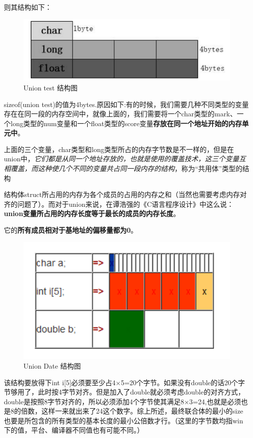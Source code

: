 \documentclass[UTF8,a4paper,12pt]{ctexbook} %
\begin{document}
	        则其结构如下：
	        \begin{figure}[h]
	        	\centering
	        	\includegraphics[width = 12cm]{union.png}
	        	\caption{Union test 结构图}
	        \end{figure} 
	        
	        sizeof(union test)的值为4bytes.原因如下:有的时候，我们需要几种不同类型的变量存在在同一段的内存空间中，就像上面的，我们需要将一个char类型的mark、一个long类型的num变量和一个float类型的score变量\textbf{存放在同一个地址开始的内存单元中}。
	        
	        上面的三个变量，char类型和long类型所占的内存字节数是不一样的，但是在union中，\textit{它们都是从同一个地址存放的，也就是使用的覆盖技术，这三个变量互相覆盖，而这种使几个不同的变量共占同一段内存的结构}，称为“共用体”类型的结构
	        
	        结构体struct所占用的内存为各个成员的占用的内存之和（当然也需要考虑内存对齐的问题了）。而对于union来说，在谭浩强的《C语言程序设计》中这么说：\textbf{union变量所占用的内存长度等于最长的成员的内存长度}。
	        
	        它的\textbf{所有成员相对于基地址的偏移量都为0}。
	        
	        \begin{figure}[h]
	        	\centering
	        	\includegraphics[width = 12cm]{union2.png}
	        	\caption{Union Date 结构图}
	        \end{figure}
	        
	        该结构要放得下int i[5]必须要至少占4×5=20个字节。如果没有double的话20个字节够用了，此时按4字节对齐。但是加入了double就必须考虑double的对齐方式，double是按照8字节对齐的，所以必须添加4个字节使其满足8×3=24,也就是必须也是8的倍数，这样一来就出来了24这个数字。综上所述，最终联合体的最小的size也要是所包含的所有类型的基本长度的最小公倍数才行。（这里的字节数均指win 下的值，平台、编译器不同值也有可能不同。）
\end{document}
